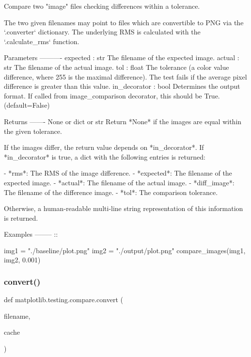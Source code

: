 \begin{DoxyVerb}Compare two "image" files checking differences within a tolerance.

The two given filenames may point to files which are convertible to
PNG via the `.converter` dictionary. The underlying RMS is calculated
with the `.calculate_rms` function.

Parameters
----------
expected : str
    The filename of the expected image.
actual : str
    The filename of the actual image.
tol : float
    The tolerance (a color value difference, where 255 is the
    maximal difference).  The test fails if the average pixel
    difference is greater than this value.
in_decorator : bool
    Determines the output format. If called from image_comparison
    decorator, this should be True. (default=False)

Returns
-------
None or dict or str
    Return *None* if the images are equal within the given tolerance.

    If the images differ, the return value depends on  *in_decorator*.
    If *in_decorator* is true, a dict with the following entries is
    returned:

    - *rms*: The RMS of the image difference.
    - *expected*: The filename of the expected image.
    - *actual*: The filename of the actual image.
    - *diff_image*: The filename of the difference image.
    - *tol*: The comparison tolerance.

    Otherwise, a human-readable multi-line string representation of this
    information is returned.

Examples
--------
::

    img1 = "./baseline/plot.png"
    img2 = "./output/plot.png"
    compare_images(img1, img2, 0.001)\end{DoxyVerb}
 \mbox{\label{namespacematplotlib_1_1testing_1_1compare_afbe684c21fe258bb99af64ddb97623bf}} 
\subsubsection{\texorpdfstring{convert()}{convert()}}
{\footnotesize\ttfamily def matplotlib.\+testing.\+compare.\+convert (\begin{DoxyParamCaption}\item[{}]{filename,  }\item[{}]{cache }\end{DoxyParamCaption})}

